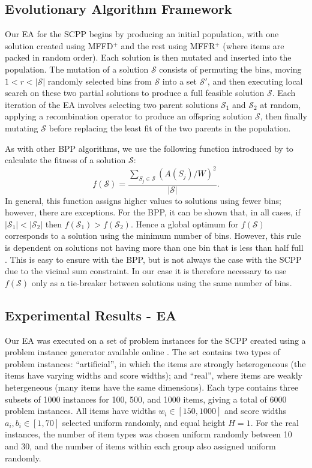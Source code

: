 \documentclass[a4paper,11pt,authoryear]{elsarticle}
\begin{document}
\subsection{Evolutionary Algorithm Framework}
\label{sub:eaframework}
\noindent Our EA for the SCPP begins by producing an initial population, with one solution created using MFFD$^+$ and the rest using MFFR$^+$ (where items are packed in random order). Each solution is then mutated and inserted into the population. The mutation of a solution $\mathcal{S}$ consists of permuting the bins, moving $1 < r < |\mathcal{S}|$ randomly selected bins from $\mathcal{S}$ into a set $\mathcal{S}'$, and then executing local search on these two partial solutions to produce a full feasible solution $\mathcal{S}$. Each iteration of the EA involves selecting two parent solutions $\mathcal{S}_1$ and $\mathcal{S}_2$ at random, applying a recombination operator to produce an offspring solution $\mathcal{S}$, then finally mutating $\mathcal{S}$ before replacing the least fit of the two parents in the population.

As with other BPP algorithms, we use the following function introduced by \cite{falkenauer1992} to calculate the fitness of a solution $\mathcal{S}$:
\begin{equation}
f(\mathcal{S}) = \frac{\sum_{S_j \in \mathcal{S}} (A(S_j)/W)^2}{|\mathcal{S}|}.
\label{eqn:fitness}
\end{equation}
In general, this function assigns higher values to solutions using fewer bins; however, there are exceptions. For the BPP, it can be shown that, in all cases, if $|\mathcal{S}_1| < |\mathcal{S}_2|$  then $f(\mathcal{S}_1) > f(\mathcal{S}_2)$. Hence a global optimum for $f(\mathcal{S})$ corresponds to a solution using the minimum number of bins. However, this rule is dependent on solutions not having more than one bin that is less than half full \citep{falkenauer1998}. This is easy to ensure with the BPP, but is not always the case with the SCPP due to the vicinal sum constraint. In our case it is therefore necessary to use $f(\mathcal{S})$ only as a tie-breaker between solutions using the same number of bins.


\subsection{Experimental Results - EA}
\label{sub:expea}
\noindent Our EA was executed on a set of problem instances for the SCPP created using a problem instance generator available online \citep{hawa2019inst}. The set contains two types of problem instances: ``artificial'', in which the items are strongly heterogeneous (the items have varying widths and score widths); and ``real'', where items are weakly hetergeneous (many items have the same dimensions). Each type contains three subsets of 1000 instances for 100, 500, and 1000 items, giving a total of 6000 problem instances. All items have widths $w_i \in [150,1000]$ and score widths $a_i, b_i \in [1,70]$ selected uniform randomly, and equal height $H=1$. For the real instances, the number of item types was chosen uniform randomly between 10 and 30, and the number of items within each group also assigned uniform randomly.
\end{document}
